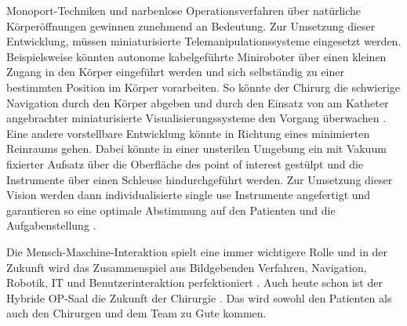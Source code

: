 Monoport-Techniken und narbenlose Operationsverfahren über natürliche Körperöffnungen gewinnen zunehmend an Bedeutung. Zur Umsetzung dieser Entwicklung, müssen miniaturisierte Telemanipulationssysteme eingesetzt werden. Beispielsweise könnten autonome kabelgeführte Miniroboter über einen kleinen Zugang in den Körper eingeführt werden und sich selbständig zu einer bestimmten Position im Körper vorarbeiten. So könnte der Chirurg die schwierige Navigation durch den Körper abgeben und durch den Einsatz von am Katheter angebrachter miniaturisierte Visualisierungssysteme den Vorgang überwachen \cite{DerDigitaleOperationssaal}.\\
Eine andere vorstellbare Entwicklung könnte in Richtung eines minimierten Reinraums gehen. Dabei könnte in einer unsterilen Umgebung ein mit Vakuum fixierter Aufsatz über die Oberfläche des \glqq point of interest\grqq{} gestülpt und die Instrumente über einen Schleuse hindurchgeführt werden. Zur Umsetzung dieser Vision werden dann individualisierte \glqq single use\grqq{} Instrumente angefertigt und garantieren so eine optimale Abstimmung auf den Patienten und die Aufgabenstellung \cite{DerDigitaleOperationssaal}.



Die Mensch-Maschine-Interaktion spielt eine immer wichtigere Rolle und in der Zukunft wird das Zusammenspiel aus Bildgebenden Verfahren, Navigation, Robotik, IT und Benutzerinteraktion perfektioniert \cite{CurrentAndFuture}.
Auch heute schon ist der Hybride OP-Saal die Zukunft der Chirurgie \cite{Maquet}. Das wird sowohl den Patienten als auch den Chirurgen und dem Team zu Gute kommen.


	
	



